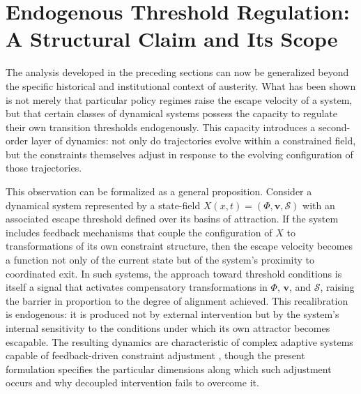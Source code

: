 \documentclass[11pt, a4paper]{article}
\begin{document}
\section{Endogenous Threshold Regulation: A Structural Claim and Its Scope}

The analysis developed in the preceding sections can now be generalized beyond the specific historical and institutional context of austerity. What has been shown is not merely that particular policy regimes raise the escape velocity of a system, but that certain classes of dynamical systems possess the capacity to regulate their own transition thresholds endogenously. This capacity introduces a second-order layer of dynamics: not only do trajectories evolve within a constrained field, but the constraints themselves adjust in response to the evolving configuration of those trajectories.

This observation can be formalized as a general proposition. Consider a dynamical system represented by a state-field $X(x,t) = (\Phi, \mathbf{v}, \mathcal{S})$ with an associated escape threshold defined over its basins of attraction. If the system includes feedback mechanisms that couple the configuration of $X$ to transformations of its own constraint structure, then the escape velocity becomes a function not only of the current state but of the system's proximity to coordinated exit. In such systems, the approach toward threshold conditions is itself a signal that activates compensatory transformations in $\Phi$, $\mathbf{v}$, and $\mathcal{S}$, raising the barrier in proportion to the degree of alignment achieved. This recalibration is endogenous: it is produced not by external intervention but by the system's internal sensitivity to the conditions under which its own attractor becomes escapable. The resulting dynamics are characteristic of complex adaptive systems capable of feedback-driven constraint adjustment \cite{prigogine1984,ott2002}, though the present formulation specifies the particular dimensions along which such adjustment occurs and why decoupled intervention fails to overcome it.
\end{document}
